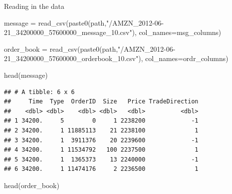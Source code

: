 \documentclass[
  oneside]{book}
\newenvironment{Shaded}{\begin{snugshade}}{\end{snugshade}}
\newcommand{\AttributeTok}[1]{\textcolor[rgb]{0.77,0.63,0.00}{#1}}
\newcommand{\FunctionTok}[1]{\textcolor[rgb]{0.00,0.00,0.00}{#1}}
\newcommand{\NormalTok}[1]{#1}
\newcommand{\OtherTok}[1]{\textcolor[rgb]{0.56,0.35,0.01}{#1}}
\newcommand{\StringTok}[1]{\textcolor[rgb]{0.31,0.60,0.02}{#1}}
\begin{document}
Reading in the data

\begin{Shaded}
\begin{Highlighting}[]
\NormalTok{message }\OtherTok{=} \FunctionTok{read\_csv}\NormalTok{(}\FunctionTok{paste0}\NormalTok{(path,}\StringTok{"/AMZN\_2012{-}06{-}21\_34200000\_57600000\_message\_10.csv"}\NormalTok{),}
                   \AttributeTok{col\_names=}\NormalTok{msg\_columns)}

\NormalTok{order\_book }\OtherTok{=} \FunctionTok{read\_csv}\NormalTok{(}\FunctionTok{paste0}\NormalTok{(path,}\StringTok{"/AMZN\_2012{-}06{-}21\_34200000\_57600000\_orderbook\_10.csv"}\NormalTok{),}
                      \AttributeTok{col\_names=}\NormalTok{ordr\_columns)}
\end{Highlighting}
\end{Shaded}

\begin{Shaded}
\begin{Highlighting}[]
\FunctionTok{head}\NormalTok{(message)}
\end{Highlighting}
\end{Shaded}

\begin{verbatim}
## # A tibble: 6 x 6
##     Time  Type  OrderID  Size   Price TradeDirection
##    <dbl> <dbl>    <dbl> <dbl>   <dbl>          <dbl>
## 1 34200.     5        0     1 2238200             -1
## 2 34200.     1 11885113    21 2238100              1
## 3 34200.     1  3911376    20 2239600             -1
## 4 34200.     1 11534792   100 2237500              1
## 5 34200.     1  1365373    13 2240000             -1
## 6 34200.     1 11474176     2 2236500              1
\end{verbatim}

\begin{Shaded}
\begin{Highlighting}[]
\FunctionTok{head}\NormalTok{(order\_book)}
\end{Highlighting}
\end{Shaded}
\end{document}
